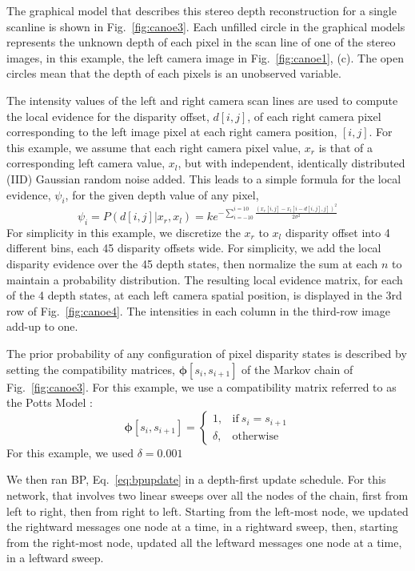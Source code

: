 The graphical model that describes this stereo depth reconstruction for a single scanline is shown in Fig.~\ref{fig:canoe3}.  Each unfilled circle in the graphical models represents the unknown depth of each pixel in the scan line of one of the stereo images, in this example, the left camera image in Fig.~\ref{fig:canoe1}, (c).  The open circles mean that the depth of each pixels is an unobserved variable.  

The intensity values of the left and right camera scan lines are used to compute the local evidence for the disparity offset, $d[i, j]$, of each right camera pixel corresponding to the left image pixel at each right camera position, $[i,j]$.  For this example, we assume that each right camera pixel value, $x_r$ is that of a corresponding left camera value, $x_l$, but with independent, identically distributed (IID) Gaussian random noise added.  This leads to a simple formula for the local evidence, $\psi_i$, for the given depth value of any pixel,
\begin{equation}
    \psi_i = P(d[i,j] | x_r, x_l) =  k e^{-\sum_{i=-10}^{i=10} \frac{(x_r[i,j] - x_l[i - d[i, j], j])^2}{2 \sigma^2}  }
\end{equation}
For simplicity in this example, we discretize the $x_r$ to $x_l$ disparity offset into 4 different bins, each 45 disparity offsets wide.  For simplicity, we add the local disparity evidence over the 45 depth states, then normalize the sum at each $n$ to maintain a probability distribution.  The resulting local evidence matrix, for each of the 4 depth states, at each left camera spatial position, is displayed in the 3rd row of Fig.~\ref{fig:canoe4}.  The intensities in each column in the third-row image add-up to one.

The prior probability of any configuration of pixel disparity states is described by setting the compatibility matrices, $\mathbf{\phi}[s_i, s_{i+1}]$ of the Markov chain of Fig.~\ref{fig:canoe3}.  For this example, we use a compatibility matrix referred to as the Potts Model \cite{Wu1982}:
\begin{equation}
  \mathbf{\phi}[s_i, s_{i+1}] = 
    \begin{cases}
      1, & \text{if}\ s_i = s_{i+1} \\
      \delta, & \text{otherwise}
    \end{cases}
\end{equation}
For this example, we used $\delta = 0.001$

We then ran BP, Eq.~\ref{eq:bpupdate} in a depth-first update schedule.  For this network, that involves two linear sweeps over all the nodes of the chain, first from left to right, then from right to left.  Starting from the left-most node, we updated the rightward messages one node at a time, in a rightward sweep, then, starting from the right-most node, updated all the leftward messages one node at a time, in a leftward sweep.

